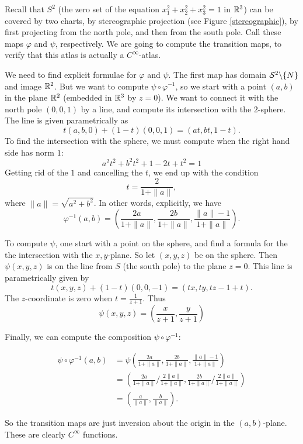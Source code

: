 \documentclass[11pt, english]{article}
\begin{document}
\begin{example}
Recall that $S^2$ (the zero set of the equation $x_1^2+x_2^2+x_3^2=1$ in $\mathbb{R}^3$) can be covered by two charts, by stereographic projection (see Figure \ref{stereographic}), by first projecting from the north pole, and then from the south pole. Call these maps $\varphi$ and $\psi$, respectively. We are going to compute the transition maps, to verify that this atlas is actually a $C^\infty$-atlas.

We need to find explicit formulae for $\varphi$ and $\psi$. The first map has domain $\mathcal{S}^2 \backslash \{ N \}$ and image $\mathbb{R}^2$. But we want to compute $\psi \circ \varphi^{-1}$, so we start with a point $(a,b)$ in the plane $\mathbb{R}^2$ (embedded in $\mathbb{R}^3$ by $z=0$). We want to connect it with the north pole $(0,0,1)$ by a line, and compute its intersection with the $2$-sphere. The line is given parametrically as \[t(a,b,0)+(1-t)(0,0,1)=(at,bt,1-t).\]
To find the intersection with the sphere, we must compute when the right hand side has norm $1$:
\[
a^2 t^2+b^2 t^2+1-2t+t^2 = 1
\]
Getting rid of the $1$ and cancelling the $t$, we end up with the condition
\[
t = \frac{2}{1+\| a \|},
\]
where $\| a \| = \sqrt{a^2 + b^2}$. In other words, explicitly, we have
\[
\varphi^{-1}(a,b) = \left(\frac{2a}{1+\|a\|},\frac{2b}{1+\|a\|},\frac{\|a \| -1}{1+\|a\|}\right).
\]

To compute $\psi$, one start with a point on the sphere, and find a formula for the the intersection with the $x,y$-plane. So let $(x,y,z)$ be on the sphere. Then $\psi(x,y,z)$ is on the line from $S$ (the south pole) to the plane $z=0$. This line is parametrically given by
\[
t(x,y,z) +(1-t)(0,0,-1) = (tx,ty,tz-1+t).
\]
The $z$-coordinate is zero when $t=\frac{1}{z+1}$. Thus
\[
\psi(x,y,z) = \left( \frac{x}{z+1}, \frac{y}{z+1} \right)
\]

Finally, we can compute the composition $\psi \circ \varphi^{-1}$:

\begin{align*}
\psi \circ \varphi^{-1}(a,b) &= \psi\left(\frac{2a}{1+\|a\|},\frac{2b}{1+\|a\|},\frac{\|a \| -1}{1+\|a\|}\right) \\
&= \left (\frac{2a}{1+\| a \|} \big / \frac{2 \| a \|}{1+\| a \|},\frac{2b}{1+\| a \|} \big / \frac{2 \| a \|}{1+\| a \|}   \right) \\
&= \left ( \frac{a}{\| a \|} , \frac{b}{\| a \|}\right).
\end{align*}

So the transition maps are just inversion about the origin in the $(a,b)$-plane. These are clearly $C^\infty$ functions.
\end{example}
\end{document}
